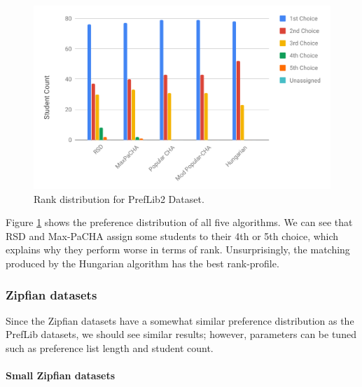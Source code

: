 \begin{figure}[h!]
  \centering
    \includegraphics[width=0.9\linewidth]{assets/plots/preflib2-ranks.pdf}    
    \caption{Rank distribution for PrefLib2 Dataset.}
    \label{fig:preflib2-rank-distribution}
\end{figure}

Figure \ref{fig:preflib2-rank-distribution} shows the preference distribution of all five algorithms. We can see that RSD and Max-PaCHA assign some students to their 4th or 5th choice, which explains why they perform worse in terms of rank. Unsurprisingly, the matching produced by the Hungarian algorithm has the best rank-profile.

\subsubsection{Zipfian datasets}
Since the Zipfian datasets have a somewhat similar preference distribution as the PrefLib datasets, we should see similar results; however, parameters can be tuned such as preference list length and student count.

\paragraph{Small Zipfian datasets}

